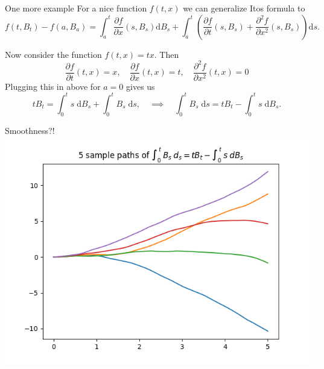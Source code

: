\documentclass{beamer}%
\numberwithin{equation}{section}
\newcommand{\ud}{\ensuremath{\mathrm{d} }}
\begin{document}
	\begin{frame}[t]{One more example}
		For a nice function $f(t,x)$ we can generalize Itos formula to 
		\[
		f(t,B_t) - f(a, B_a) = \int_a^t \frac{\partial f}{\partial x}(s, B_s) \ud B_s + \int_a^t \left( \frac{\partial f}{\partial t}(s, B_s) + \frac{\partial^2 f}{\partial x^2}(s, B_s) \right) \ud s.
		\]
		\begin{example}
			Now consider the function $f(t,x) = tx$. Then 
			\[
			\frac{\partial f}{\partial t}(t,x) = x, \quad \frac{\partial f}{\partial x}(t,x) = t, \quad \frac{\partial^2 f}{\partial x^2}(t,x) =0
			\]
			Plugging this in above for $a=0$ gives us
			\[
			tB_t = \int_0^t s \; \ud B_s + \int_0^t B_s \; \ud s, \quad \implies \quad 	\int_0^t B_s \; \ud s = t B_t -  \int_0^t s \; \ud B_s.
			\]
			
		\end{example}
	\end{frame}
	
	\begin{frame}[t]{Smoothness?!}
		\centering
		\includegraphics[scale=.6]{riemannBM.png}
	\end{frame}
	
\end{document}

